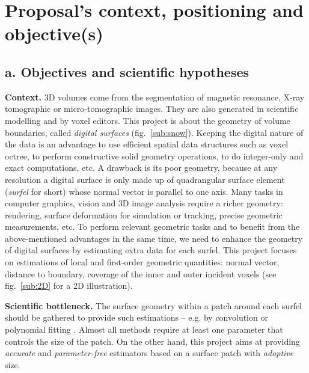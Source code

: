 \section{Proposal's context, positioning and objective(s)}
\label{sec:context}

\subsection{a. Objectives and scientific hypotheses}


\noindent\textbf{Context.}
3D volumes come from the segmentation of magnetic resonance, X-ray tomographic or micro-tomographic images. 
They are also generated in scientific modelling and by voxel editors. 
This project is about the geometry of volume boundaries, called \emph{digital surfaces} (fig.~\ref{sub:snow}). 
Keeping the digital nature of the data is an advantage
to use efficient spatial data structures such as voxel octree, 
to perform constructive solid geometry operations,
to do integer-only and exact computations, etc.
A drawback is its poor geometry, because at any resolution a digital surface is only 
made up of quadrangular surface element (\emph{surfel} for short) 
whose normal vector is parallel to one axis. 
Many tasks in computer graphics, vision and 3D image analysis require a richer geometry: 
rendering, surface deformation for simulation or tracking, precise geometric measurements, etc.
To perform relevant geometric tasks and 
to benefit from the above-mentioned advantages in the same time, 
we need to enhance the geometry of digital surfaces by estimating extra data for each surfel. 
This project focuses on estimations of local and first-order geometric quantities: 
normal vector, distance to boundary, coverage of the inner and outer incident voxels 
(see fig.~\ref{sub:2D} for a 2D illustration).  

\noindent\textbf{Scientific bottleneck.}
The surface geometry within a patch around each surfel should be gathered to provide such estimations
-- e.g. by convolution \cite{Pottmann2009} or polynomial fitting \cite{Cazals2008}.
Almost all methods require at least one parameter that controls the size of the patch.  
On the other hand, this project aims at providing \emph{accurate} and \emph{parameter-free} estimators
based on a surface patch with \emph{adaptive} size.

